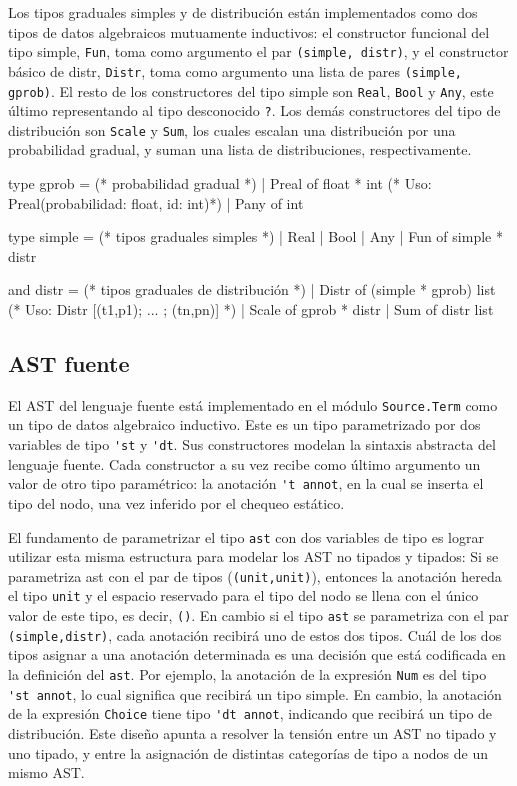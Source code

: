 Los tipos graduales simples y de distribución están implementados como dos tipos de datos algebraicos mutuamente inductivos: el constructor funcional del tipo simple, \verb|Fun|, toma como argumento el par \verb|(simple, distr)|, y el constructor básico de distr, \verb|Distr|, toma como argumento una lista de pares \verb|(simple, gprob)|.  El resto de los constructores del tipo simple son
\verb|Real|, \verb|Bool| y \verb|Any|, este último representando al tipo desconocido \verb|?|. Los demás constructores del tipo de distribución son \verb|Scale| y
\verb|Sum|, los cuales escalan una distribución por una probabilidad gradual, y suman una lista de distribuciones, respectivamente.

\begin{ocamlblock}[caption={Probabilidad Gradual y Tipos Graduales},label={asdf}]
type gprob  = (* probabilidad gradual *)
| Preal of float * int (* Uso: Preal(probabilidad: float, id: int)*)
| Pany of int 

type simple = (* tipos graduales simples *)
| Real | Bool
| Any  | Fun of simple * distr

and distr = (* tipos graduales de distribución *)
| Distr of (simple * gprob) list (* Uso: Distr [(t1,p1); ... ; (tn,pn)] *) 
| Scale of gprob * distr 
| Sum   of distr list
\end{ocamlblock}


\subsection{AST fuente}

El AST del lenguaje fuente está implementado en el
módulo \verb|Source.Term| como un tipo de datos algebraico inductivo. Este es un
tipo parametrizado por dos variables de tipo \verb|'st| y \verb|'dt|. Sus
constructores modelan la sintaxis abstracta del lenguaje fuente. Cada
constructor a su vez recibe como último argumento un valor de otro tipo
paramétrico: la anotación \verb|'t annot|, en la cual se inserta el tipo del
nodo, una vez inferido por el chequeo estático.

El fundamento de parametrizar el tipo \verb|ast| con dos variables de tipo es lograr utilizar
esta misma estructura para modelar los AST no tipados y tipados: Si se parametriza
ast con el par de tipos (\verb|(unit,unit)|), entonces la anotación hereda el tipo \verb|unit|
y el espacio reservado para el tipo del nodo se llena con el único valor de este tipo, es decir, \verb|()|.
En cambio si el tipo \verb|ast| se parametriza con el par \verb|(simple,distr)|, cada anotación recibirá
uno de estos dos tipos. Cuál de los dos tipos asignar a una anotación determinada es una decisión
que está codificada en la definición del \verb|ast|. Por ejemplo, la anotación de la expresión \verb|Num|
es del tipo \verb|'st annot|, lo cual significa que recibirá un tipo simple. En cambio,
la anotación de la expresión \verb|Choice| tiene tipo \verb|'dt annot|, indicando que recibirá un
 tipo de distribución. Este diseño apunta a resolver la tensión entre un AST no tipado y uno tipado,
y entre la asignación de distintas categorías de tipo a nodos de un mismo AST.

